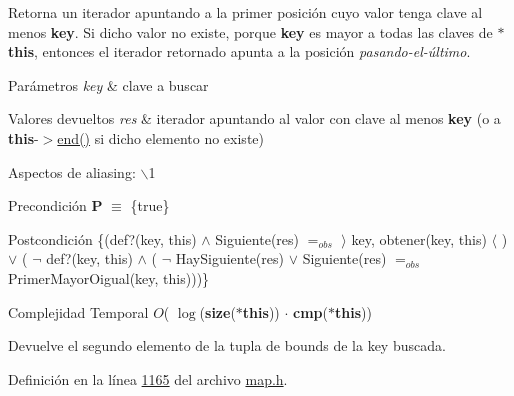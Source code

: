 \-Retorna un iterador apuntando a la primer posición cuyo valor tenga clave al menos {\bfseries key}. \-Si dicho valor no existe, porque {\bfseries key} es mayor a todas las claves de {\bfseries $\ast$this}, entonces el iterador retornado apunta a la posición {\itshape pasando-\/el-\/último\/}.


\begin{DoxyParams}{\-Parámetros}
{\em key} & clave a buscar \\
\hline
\end{DoxyParams}

\begin{DoxyRetVals}{\-Valores devueltos}
{\em res} & iterador apuntando al valor con clave al menos {\bfseries key} (o a {\bfseries this}-\/$>$\hyperlink{classaed2_1_1map_a76023e6a56cb625513e1b5ea028bf983_a76023e6a56cb625513e1b5ea028bf983}{end()} si dicho elemento no existe)\\
\hline
\end{DoxyRetVals}
\begin{DoxyParagraph}{\-Aspectos de aliasing\-:}
$\backslash$1
\end{DoxyParagraph}
\begin{DoxyPrecond}{\-Precondición}
{\bfseries \-P} $\equiv$ \{true\} 
\end{DoxyPrecond}
\begin{DoxyPostcond}{\-Postcondición}
\{(def?(key, this) $\land$ \-Siguiente(res) $=_{obs}$ $\rangle$ key, obtener(key, this) $\langle$ ) $\lor$ ( $\lnot$ def?(key, this) $\land$ ( $\lnot$ \-Hay\-Siguiente(res) $\lor$ \-Siguiente(res) $=_{obs}$ \-Primer\-Mayor\-Oigual(key, this)))\}
\end{DoxyPostcond}

\begin{DoxyDescription}
\item[\-Complejidad \-Temporal]$O$( $\log$({\bfseries size}({\bfseries $\ast$this})) $\cdot$ {\bfseries cmp}({\bfseries $\ast$this}))
\end{DoxyDescription}

\-Devuelve el segundo elemento de la tupla de bounds de la key buscada. 

\-Definición en la línea \hyperlink{map_8h_source_l01165}{1165} del archivo \hyperlink{map_8h_source}{map.\-h}.

